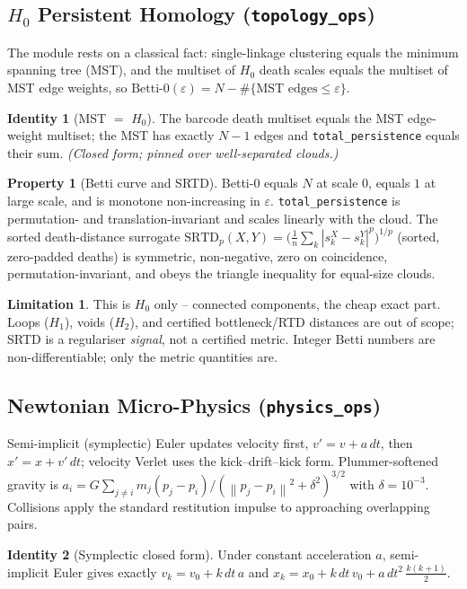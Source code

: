 \documentclass[11pt]{article}
\theoremstyle{definition}
\newtheorem{property}{Property}[section]
\newtheorem{identity}{Identity}[section]
\newtheorem{limitation}{Limitation}[section]
\newcommand{\norm}[1]{\left\lVert #1 \right\rVert}
\newcommand{\code}[1]{\texttt{#1}}
\newcommand{\eps}{\varepsilon}
\begin{document}
\subsection{$H_0$ Persistent Homology (\code{topology\_ops})}
The module rests on a classical fact: single-linkage clustering equals the
minimum spanning tree (MST), and the multiset of $H_0$ death scales equals
the multiset of MST edge weights, so
$\text{Betti-}0(\eps)=N-\#\{\text{MST edges}\le\eps\}$.

\begin{identity}[MST $=$ $H_0$]
The barcode death multiset equals the MST edge-weight multiset; the MST has
exactly $N-1$ edges and \code{total\_persistence} equals their sum.
\emph{(Closed form; pinned over well-separated clouds.)}
\end{identity}

\begin{property}[Betti curve and SRTD]
Betti-$0$ equals $N$ at scale $0$, equals $1$ at large scale, and is
monotone non-increasing in $\eps$. \code{total\_persistence} is permutation-
and translation-invariant and scales linearly with the cloud. The sorted
death-distance surrogate
$\mathrm{SRTD}_p(X,Y)=\big(\tfrac1n\sum_k|s^X_k-s^Y_k|^p\big)^{1/p}$ (sorted,
zero-padded deaths) is symmetric, non-negative, zero on coincidence,
permutation-invariant, and obeys the triangle inequality for equal-size
clouds.
\end{property}

\begin{limitation}
This is $H_0$ only -- connected components, the cheap exact part. Loops
($H_1$), voids ($H_2$), and certified bottleneck/RTD distances are out of
scope; SRTD is a regulariser \emph{signal}, not a certified metric. Integer
Betti numbers are non-differentiable; only the metric quantities are.
\end{limitation}

\subsection{Newtonian Micro-Physics (\code{physics\_ops})}
Semi-implicit (symplectic) Euler updates velocity first,
$v'=v+a\,dt$, then $x'=x+v'\,dt$; velocity Verlet uses the kick--drift--kick
form. Plummer-softened gravity is
$a_i=G\sum_{j\neq i} m_j (p_j-p_i)/(\norm{p_j-p_i}^2+\delta^2)^{3/2}$
with $\delta=10^{-3}$. Collisions apply the standard restitution impulse to
approaching overlapping pairs.

\begin{identity}[Symplectic closed form]
Under constant acceleration $a$, semi-implicit Euler gives exactly
$v_k=v_0+k\,dt\,a$ and
$x_k=x_0+k\,dt\,v_0+a\,dt^2\,\tfrac{k(k+1)}{2}$.
\end{identity}
\end{document}
